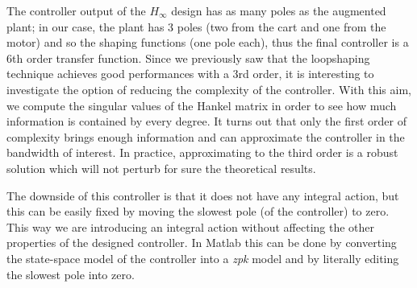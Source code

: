 The controller output of the $H_{\infty}$ design has as many poles as the augmented plant; in our case, the plant has 3 poles (two from the cart and one from the motor) and so the shaping functions (one pole each), thus the final controller is a 6th order transfer function. Since we previously saw that the loopshaping technique achieves good performances with a 3rd order, it is interesting to investigate the option of reducing the complexity of the controller. With this aim, we compute the singular values of the Hankel matrix in order to see how much information is contained by every degree. It turns out that only the first order of complexity brings enough information and can approximate the controller in the bandwidth of interest. In practice, approximating to the third order is a robust solution which will not perturb for sure the theoretical results.
  \begin{figure}[h]
  \centering
  \hfill
  \caption{}
\end{figure}
The downside of this controller is that it does not have any integral action, but this can be easily fixed by moving the slowest pole (of the controller) to zero. This way we are introducing an integral action without affecting the other properties of the designed controller. In Matlab this can be done by converting the state-space model of the controller into a \emph{zpk} model and by literally editing the slowest pole into zero.\\
